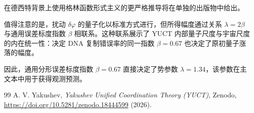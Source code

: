 \documentclass[12pt]{article}
\theoremstyle{remark}
\begin{document}
	在德西特背景上使用格林函数形式主义的更严格推导将在单独的出版物中给出。
	
	值得注意的是，扰动 $\delta\varphi$ 的量子化以标准方式进行，但所得幅度通过关系 $\lambda = 2\beta$ 与通用误差标度指数 $\beta$ 相联系。这种联系展示了 YUCT 内部量子尺度与宇宙尺度的内在统一性：决定 DNA 复制错误率的同一指数 $\beta = 0.67$ 也决定了原初量子涨落的幅度。
	
	因此，通用分形误差标度指数 $\beta = 0.67$ 直接决定了势参数 $\lambda = 1.34$，该参数在主文本中用于获得观测预测。
	
	\begin{thebibliography}{99}
		A. V. Yakushev, \emph{Yakushev Unified Coordination Theory (YUCT)}, Zenodo, \url{https://doi.org/10.5281/zenodo.18444599} (2026).
	\end{thebibliography}
	
\end{document}
